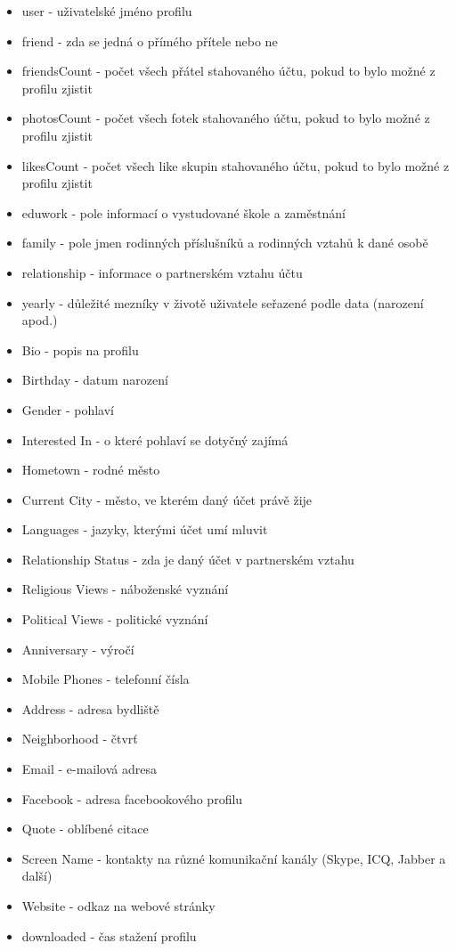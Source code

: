 \documentclass[thesis=M,czech]{FITthesis}[2013/05/10]
\begin{document}
\begin{itemize}
  \item user - uživatelské jméno profilu
  \item friend - zda se jedná o přímého přítele nebo ne
  \item friendsCount - počet všech přátel stahovaného účtu, pokud to bylo možné z profilu zjistit
  \item photosCount - počet všech fotek stahovaného účtu, pokud to bylo možné z profilu zjistit
  \item likesCount - počet všech like skupin stahovaného účtu, pokud to bylo možné z profilu zjistit
  \item eduwork - pole informací o vystudované škole a zaměstnání
  \item family - pole jmen rodinných příslušníků a rodinných vztahů k dané osobě
  \item relationship - informace o partnerském vztahu účtu
  \item yearly - důležité mezníky v životě uživatele seřazené podle data (narození apod.)
  \item Bio - popis na profilu
  \item Birthday - datum narození 
  \item Gender - pohlaví
  \item Interested In - o které pohlaví se dotyčný zajímá
  \item Hometown - rodné město
  \item Current City - město, ve kterém daný účet právě žije
  \item Languages - jazyky, kterými účet umí mluvit
  \item Relationship Status - zda je daný účet v partnerském vztahu
  \item Religious Views - náboženské vyznání
  \item Political Views - politické vyznání
  \item Anniversary - výročí
  \item Mobile Phones - telefonní čísla
  \item Address - adresa bydliště
  \item Neighborhood - čtvrť
  \item Email - e-mailová adresa
  \item Facebook - adresa facebookového profilu
  \item Quote - oblíbené citace
  \item Screen Name - kontakty na různé komunikační kanály (Skype, ICQ, Jabber a další)
  \item Website - odkaz na webové stránky
  \item downloaded - čas stažení profilu
\end{itemize}
\end{document}
